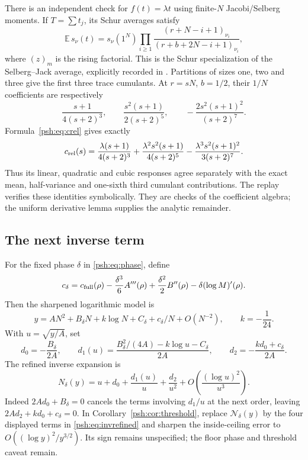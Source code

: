\documentclass[11pt,a4paper]{article}
\numberwithin{equation}{section}
\theoremstyle{remark}\newtheorem{remark}[theorem]{Remark}
\begin{document}
There is an independent check for $f(t)=\lambda t$ using finite-$N$
Jacobi/Selberg moments. If $T=\sum t_j$, its Schur averages satisfy
\begin{equation}\label{psh:eq:Schur}
 \mathbb E\,s_\nu(t)=s_\nu(1^N)
 \prod_{i\geq1}\frac{(r+N-i+1)_{\nu_i}}
                        {(r+b+2N-i+1)_{\nu_i}},
\end{equation}
where $(z)_m$ is the rising factorial. This is the Schur specialization
of the Selberg--Jack average, explicitly recorded in
\cite[equation (4.1)]{psh-arw}. Partitions of sizes one, two and three give
the first three trace cumulants. At $r=sN$, $b=1/2$, their $1/N$
coefficients are respectively
\[
 \frac{s+1}{4(s+2)^3},\qquad
 \frac{s^2(s+1)}{2(s+2)^5},\qquad
 -\frac{2s^2(s+1)^2}{(s+2)^7}.
\]
Formula~\eqref{psh:eq:crel} gives exactly
\begin{equation}\label{psh:eq:cTrace}
 c_{\rm rel}(s)=
 \frac{\lambda(s+1)}{4(s+2)^3}
 +\frac{\lambda^2s^2(s+1)}{4(s+2)^5}
 -\frac{\lambda^3s^2(s+1)^2}{3(s+2)^7}.
\end{equation}
Thus its linear, quadratic and cubic responses agree separately with
the exact mean, half-variance and one-sixth third cumulant contributions.
The replay verifies these identities symbolically. They are checks of
the coefficient algebra; the uniform derivative lemma supplies the
analytic remainder.

\subsection{The next inverse term}
For the fixed phase $\delta$ in \eqref{psh:eq:phase}, define
\begin{equation}\label{psh:eq:cdelta}
 c_\delta=c_{\rm full}(\rho)-\frac{\delta^3}{6}A'''(\rho)
          +\frac{\delta^2}{2}B''(\rho)-\delta(\log M)'(\rho).
\end{equation}
Then the sharpened logarithmic model is
\[
 y=AN^2+B_\delta N+k\log N+C_\delta+c_\delta/N+O(N^{-2}),
 \qquad k=-\frac1{24}.
\]
With $u=\sqrt{y/A}$, set
\[
 d_0=-\frac{B_\delta}{2A},\qquad
 d_1(u)=\frac{B_\delta^2/(4A)-k\log u-C_\delta}{2A},\qquad
 d_2=-\frac{kd_0+c_\delta}{2A}.
\]
The refined inverse expansion is
\begin{equation}\label{psh:eq:invrefined}
 N_\delta(y)=u+d_0+\frac{d_1(u)}u+\frac{d_2}{u^2}
                +O\left(\frac{(\log u)^2}{u^3}\right).
\end{equation}
Indeed $2Ad_0+B_\delta=0$ cancels the terms involving $d_1/u$ at the
next order, leaving $2Ad_2+kd_0+c_\delta=0$.
In Corollary~\ref{psh:cor:threshold}, replace $\mathcal N_\delta(y)$ by the
four displayed terms in \eqref{psh:eq:invrefined} and sharpen the
inside-ceiling error to $O((\log y)^2/y^{3/2})$.
Its sign remains unspecified; the floor phase and threshold caveat remain.
\end{document}

